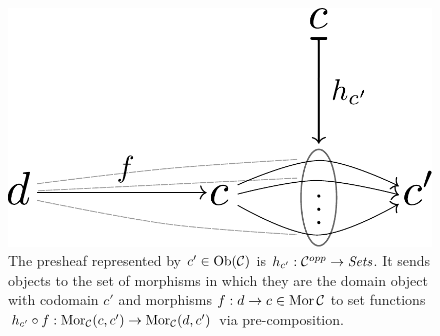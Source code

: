 \begin{frame}
\begin{figure}
\noindent\includegraphics[width=0.7\framewidth]{fig/hom.pdf}
\caption{The presheaf represented by $c' \in \mathop{\rm Ob}\nolimits({\mathcal C})$ is $h_{c'} : {\mathcal C}^{opp} \rightarrow \textit{Sets}$. It sends objects to the set of morphisms in which they are the domain object with codomain $c'$ and morphisms $f:d \rightarrow c \in \mathop{\rm Mor}\nolimits{{\mathcal C}}$ to set functions $h_{c'} \circ f: \mathop{\rm Mor}\nolimits_{{\mathcal C}}(c,c') \rightarrow \mathop{\rm Mor}\nolimits_{{\mathcal C}}(d,c')$ via pre-composition.}
\label{fig:hom}
\end{figure}
\end{frame}


